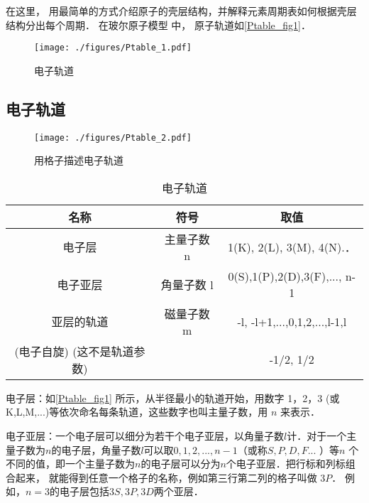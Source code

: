
\begin{issues}
\issueTODO
\end{issues}

在这里， 用最简单的方式介绍原子的壳层结构，并解释元素周期表如何根据壳层结构分出每个周期． 在玻尔原子模型 中， 原子轨道如\autoref{Ptable_fig1}．

\begin{figure}[ht]
\centering
\texttt{[image: ./figures/Ptable\_1.pdf]}
\caption{电子轨道}\label{Ptable_fig1}
\end{figure}

\subsection{电子轨道}
\begin{figure}[ht]
\centering
\texttt{[image: ./figures/Ptable\_2.pdf]}
\caption{用格子描述电子轨道} 
\end{figure}

\begin{table}[ht]
\centering
\caption{电子轨道}\label{Ptable_tab1}
\begin{tabular}{|c|c|c|}
\hline
名称&符号&取值\\
\hline
电子层&主量子数 n& 1(K), 2(L), 3(M), 4(N).． \\
\hline
电子亚层&角量子数 l& 0(S),1(P),2(D),3(F),..., n-1 \\
\hline
亚层的轨道&磁量子数 m & -l, -l+1,...,0,1,2,...,l-1,l \\
\hline
(电子自旋) (这不是轨道参数)&&-1/2, 1/2\\
\hline
\end{tabular}
\end{table}

电子层：如\autoref{Ptable_fig1} 所示，从半径最小的轨道开始，用数字 1，2，3 (或K,L,M,...)等依次命名每条轨道，这些数字也叫主量子数，用 $n$ 来表示． 

电子亚层：一个电子层可以细分为若干个电子亚层，以角量子数$l$计．对于一个主量子数为$n$的电子层，角量子数$l$可以取$0,1,2,...,n-1$（或称$S,P,D,F...$ ）等$n$ 个不同的值，即一个主量子数为$n$的电子层可以分为$n$个电子亚层．把行标和列标组合起来， 就能得到任意一个格子的名称，例如第三行第二列的格子叫做 $3P$． 例如，$n=3$的电子层包括$3S, 3P, 3D$两个亚层．

